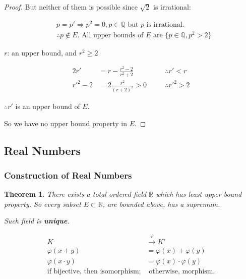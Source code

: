 \documentclass{article}
\newtheorem*{theorem}{Theorem}
\begin{document}
\begin{proof}
        But neither of them is possible since $\sqrt{2}$ is irrational:
        
        \begin{align*}
            &p = p' \Rightarrow p^{2} = 0, p \in \mathbb{Q} \text{ but } p \text{ is irrational.} \\
            &\therefore p \notin E. \text{ All upper bounds of } E \text{ are } \{ p \in \mathbb{Q}, p^{2} > 2 \}
        \end{align*}
        
        $r$: an upper bound, and $r^{2} \geq 2$
        
        \begin{alignat*}{2}
            r' &= r - \frac{r^{2} - 2}{r^{2} + 2} \quad &&\therefore r' < r \\
            r'^{2} - 2 &= 2\frac{r^{2}}{(r + 2)^{2}} > 0 \quad &&\therefore r'^{2} > 2
        \end{alignat*}
        
        $\therefore r'$ is an upper bound of $E$.
        
        So we have no upper bound property in $E$.
    \end{proof}
    
    \subsection{Real Numbers}
    
    \subsubsection{Construction of Real Numbers}

    \begin{theorem}
        There exists a total ordered field $\mathbb{R}$ which has least upper bound property. So every subset $E \subset \mathbb{R}$, are bounded above, has a supremum.
        
        Such field is \textbf{unique}.
    \end{theorem}

    \begin{align*}
        K &\xrightarrow{\varphi} K' \\
        \varphi(x + y) &= \varphi(x) + \varphi(y) \\
        \varphi(x \cdot y) &= \varphi(x) \cdot \varphi(y) \\
        \text{if bijective, then isomorphism;} &\text{ otherwise, morphism.}
    \end{align*}
    
\end{document}
